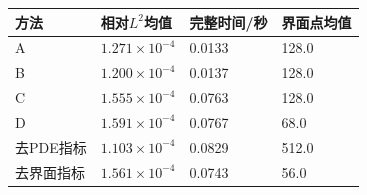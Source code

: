 \begin{tabular}{llll}\toprule
方法 & 相对$L^2$均值 & 完整时间/秒 & 界面点均值 \\ \midrule
A & $1.271\times10^{-4}$ & 0.0133 & 128.0 \\
B & $1.200\times10^{-4}$ & 0.0137 & 128.0 \\
C & $1.555\times10^{-4}$ & 0.0763 & 128.0 \\
D & $1.591\times10^{-4}$ & 0.0767 & 68.0 \\
去PDE指标 & $1.103\times10^{-4}$ & 0.0829 & 512.0 \\
去界面指标 & $1.561\times10^{-4}$ & 0.0743 & 56.0 \\
\bottomrule\end{tabular}
